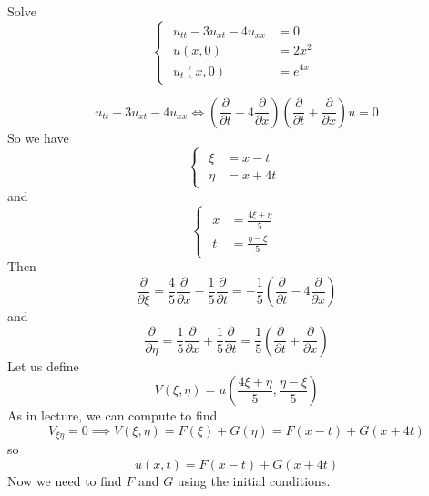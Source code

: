 \documentclass[plain]{pset}
\begin{document}
\begin{problem}
Solve
\[\begin{cases}\begin{aligned}
            u_{tt} - 3u_{xt} - 4u_{xx} & = 0      \\
            u(x, 0)                    & = 2x^2   \\
            u_t(x, 0)                  & = e^{4x}
        \end{aligned}\end{cases}\]
\end{problem}
\begin{solution}

    \[u_{tt} - 3u_{xt} - 4u_{xx} \Longleftrightarrow \left(\frac{\partial}{\partial t} - 4\frac{\partial }{\partial x}\right)\left(\frac{\partial }{\partial t} + \frac{\partial }{\partial x}\right)u = 0\]
    So we have
    \[\begin{cases}\begin{aligned}
                \xi  & = x - t  \\
                \eta & = x + 4t
            \end{aligned}\end{cases}\]
    and \[\begin{cases}\begin{aligned}
                x & = \frac{4\xi + \eta}{5} \\
                t & = \frac{\eta - \xi}{5}
            \end{aligned}\end{cases}\]
    Then
    \[\frac{\partial }{\partial \xi} = \frac{4}{5}\frac{\partial }{\partial x} - \frac{1}{5}\frac{\partial }{\partial t} = -\frac{1}{5}\left(\frac{\partial }{\partial t} - 4\frac{\partial }{\partial x}\right)\]
    and
    \[\frac{\partial }{\partial \eta} = \frac{1}{5}\frac{\partial }{\partial x} + \frac{1}{5}\frac{\partial }{\partial t} = \frac{1}{5}\left(\frac{\partial }{\partial t} + \frac{\partial }{\partial x}\right)\]
    Let us define
    \[V(\xi, \eta) = u\left(\frac{4\xi + \eta}{5}, \frac{\eta - \xi}{5}\right)\]
    As in lecture, we can compute to find
    \[V_{\xi\eta} = 0 \implies V(\xi, \eta) = F(\xi) + G(\eta) = F(x - t) + G(x + 4t)\]
    so
    \[u(x, t) = F(x - t) + G(x + 4t)\]
    Now we need to find \(F\) and \(G\) using the initial conditions.



\end{solution}
\end{document}
